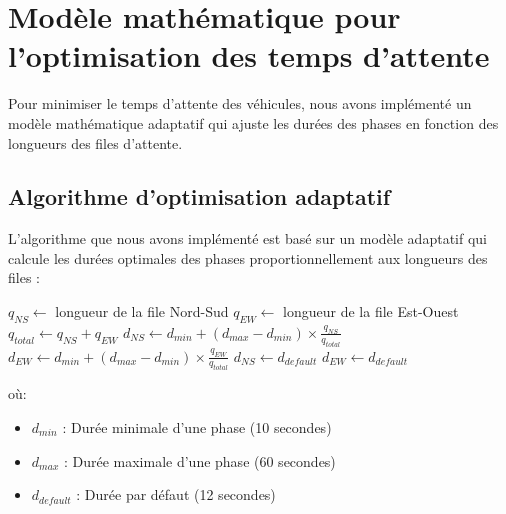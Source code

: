 \section{Modèle mathématique pour l'optimisation des temps d'attente}
\label{sec:optimisation}

Pour minimiser le temps d'attente des véhicules, nous avons implémenté un modèle mathématique adaptatif qui ajuste les durées des phases en fonction des longueurs des files d'attente.

\subsection{Algorithme d'optimisation adaptatif}
\label{subsec:algorithme}

L'algorithme que nous avons implémenté est basé sur un modèle adaptatif qui calcule les durées optimales des phases proportionnellement aux longueurs des files :

\begin{algorithm}
\caption{Optimisation adaptative des durées de phases}
\begin{algorithmic}[1]
\State $q_{NS} \gets$ longueur de la file Nord-Sud
\State $q_{EW} \gets$ longueur de la file Est-Ouest
\State $q_{total} \gets q_{NS} + q_{EW}$
    \State $d_{NS} \gets d_{min} + (d_{max} - d_{min}) \times \frac{q_{NS}}{q_{total}}$
    \State $d_{EW} \gets d_{min} + (d_{max} - d_{min}) \times \frac{q_{EW}}{q_{total}}$
\Else
    \State $d_{NS} \gets d_{default}$
    \State $d_{EW} \gets d_{default}$
\EndIf
\end{algorithmic}
\end{algorithm}

où:
\begin{itemize}
    \item $d_{min}$ : Durée minimale d'une phase (10 secondes)
    \item $d_{max}$ : Durée maximale d'une phase (60 secondes)
    \item $d_{default}$ : Durée par défaut (12 secondes)
\end{itemize}
